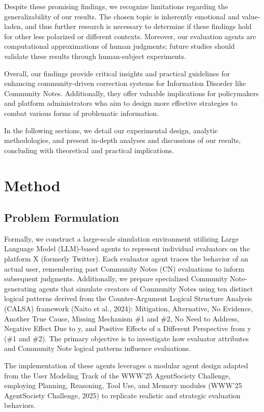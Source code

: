 \documentclass[twocolumn]{article}
\begin{document}
Despite these promising findings, we recognize limitations regarding the generalizability of our results. The chosen topic is inherently emotional and value-laden, and thus further research is necessary to determine if these findings hold for other less polarized or different contexts. Moreover, our evaluation agents are computational approximations of human judgments; future studies should validate these results through human-subject experiments.

Overall, our findings provide critical insights and practical guidelines for enhancing community-driven correction systems for Information Disorder like Community Notes. Additionally, they offer valuable implications for policymakers and platform administrators who aim to design more effective strategies to combat various forms of problematic information.

In the following sections, we detail our experimental design, analytic methodologies, and present in-depth analyses and discussions of our results, concluding with theoretical and practical implications.



\section{Method}
\subsection{Problem Formulation}
Formally, we construct a large-scale simulation environment utilizing Large Language Model (LLM)-based agents to represent individual evaluators on the platform X (formerly Twitter). Each evaluator agent traces the behavior of an actual user, remembering past Community Notes (CN) evaluations to inform subsequent judgments. Additionally, we prepare specialized Community Note-generating agents that simulate creators of Community Notes using ten distinct logical patterns derived from the Counter-Argument Logical Structure Analysis (CALSA) framework (Naito et al., 2024): Mitigation, Alternative, No Evidence, Another True Cause, Missing Mechanism \#1 and \#2, No Need to Address, Negative Effect Due to y, and Positive Effects of a Different Perspective from y (\#1 and \#2). The primary objective is to investigate how evaluator attributes and Community Note logical patterns influence evaluations.

The implementation of these agents leverages a modular agent design adapted from the User Modeling Track of the WWW'25 AgentSociety Challenge, employing Planning, Reasoning, Tool Use, and Memory modules (WWW'25 AgentSociety Challenge, 2025) to replicate realistic and strategic evaluation behaviors.
\end{document}
